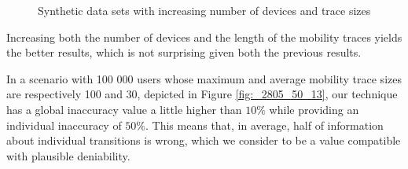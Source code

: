 \begin{figure}[htb]
\hspace*{-0.7em}
\hspace*{-0.7em}
\caption{Synthetic data sets with increasing number of devices and
  trace sizes}
\label{fig:perf_results_sim_devices_traces}
\end{figure}

Increasing both the number of devices and the length of the mobility
traces yields the better results, which is not surprising given both
the previous results.

In a scenario with 100 000 users whose maximum and average mobility
trace sizes are respectively 100 and 30, depicted in Figure
\ref{fig:_2805_50_13}, our technique has a global inaccuracy value a
little higher than $10\%$ while providing an individual inaccuracy of
$50\%$.  This means that, in average, half of information about
individual transitions is wrong, which we consider to be a value
compatible with plausible deniability.

